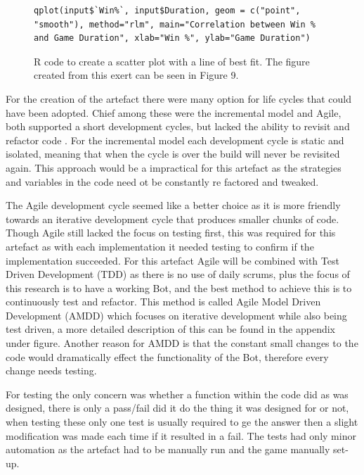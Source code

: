 \documentclass[journal]{IEEEtran}
\begin{document}
\begin{figure}[H]
	\begin{lstlisting}
qplot(input$`Win%`, input$Duration, geom = c("point",
"smooth"), method="rlm", main="Correlation between Win % and Game Duration", xlab="Win %", ylab="Game Duration")
\end{lstlisting}
	\caption{R code to create a scatter plot with a line of best fit. The figure created from this exert can be seen in Figure 9.}
	\label{Fig3}
\end{figure}

For the creation of the artefact there were many option for life cycles that could have been adopted. Chief among these were the incremental model and Agile, both supported a short development cycles, but lacked the ability to revisit and refactor code \cite{Life}. For the incremental model each development cycle is static and isolated, meaning that when the cycle is over the build will never be revisited again. This approach would be a impractical for this artefact as the strategies and variables in the code need ot be constantly re factored and tweaked.

The Agile development cycle seemed like a better choice as it is more friendly towards an iterative development cycle that produces smaller chunks of code. Though Agile still lacked 
the focus on testing first, this was required for this artefact as with each implementation it needed testing to confirm if the implementation succeeded. For this artefact Agile will be combined with Test Driven Development (TDD) as there is no use of daily scrums, plus the focus of this research is to have a working Bot, and the best method to achieve this is to continuously test and refactor. This method is called Agile Model Driven Development (AMDD) which focuses on iterative development while also being test driven, a more detailed description of this can be found in the appendix under figure. Another reason for AMDD is that the constant small changes to the code would dramatically effect the functionality of the Bot, therefore every change needs testing.

For testing the only concern was whether a function within the code did as was designed, there is only a pass/fail did it do the thing it was designed for or not, when testing these only one test is usually required to ge the answer then a slight modification was made each time if it resulted in a fail. The tests had only minor automation as the artefact had to be manually run and the game manually set-up.
\newline
\end{document}
